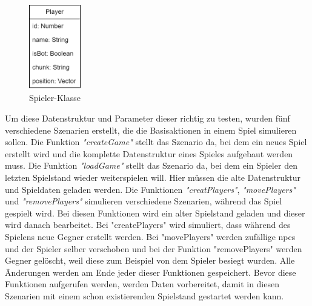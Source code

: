 \begin{figure}[htp]
    \centering
    \includegraphics[width=0.2\textwidth]{images/PlayerKlasse.png}
    \caption{Spieler-Klasse}
    \label{fig:playerClass}
\end{figure}

Um diese Datenstruktur und Parameter dieser richtig zu testen, wurden fünf verschiedene Szenarien erstellt, die die Basisaktionen in einem Spiel simulieren sollen. Die Funktion \textit{"createGame"} stellt das Szenario da, bei dem ein neues Spiel erstellt wird und die komplette Datenstruktur eines Spieles aufgebaut werden muss. Die Funktion \textit{"loadGame"} stellt das Szenario da, bei dem ein Spieler den letzten Spielstand wieder weiterspielen will. Hier müssen die alte Datenstruktur und Spieldaten geladen werden. Die Funktionen \textit{"creatPlayers"}, \textit{"movePlayers"} und \textit{"removePlayers"} simulieren verschiedene Szenarien, während das Spiel gespielt wird. Bei diesen Funktionen wird ein alter Spielstand geladen und dieser wird danach bearbeitet. Bei "createPlayers" wird simuliert, dass während des Spielens neue Gegner erstellt werden. Bei "movePlayers" werden zufällige \acp{npc} und der Spieler selber verschoben und bei der Funktion "removePlayers" werden Gegner gelöscht, weil diese zum Beispiel von dem Spieler besiegt wurden. Alle Änderungen werden am Ende jeder dieser Funktionen gespeichert. Bevor diese Funktionen aufgerufen werden, werden Daten vorbereitet, damit in diesen Szenarien mit einem schon existierenden Spielstand gestartet werden kann.

